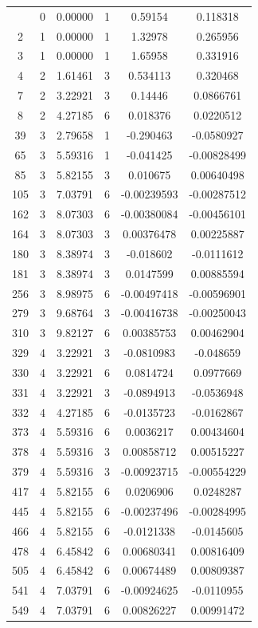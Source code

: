 \documentclass[11pt]{article}
\begin{document}
\begin{longtable} {c c c c c c}
\bottomrule
\endlastfoot
1  &	0 &	0.00000&	1&	0.59154 & 	0.118318 \\
2  &	1 &	0.00000&	1&	1.32978 &	0.265956\\
3  &	1&	0.00000&	1&	1.65958 &	0.331916\\
4  &	2&	1.61461&	3&	0.534113&	0.320468\\
7  &	2&	3.22921&	3&	0.14446	 &       0.0866761\\
8  &	2&	4.27185&	6&	0.018376&	0.0220512\\
39 &	3&	2.79658&	1&	-0.290463&	-0.0580927\\
65 &	3&	5.59316&	1&	-0.041425&	-0.00828499\\
85 &	3&	5.82155&	3&	0.010675&	0.00640498\\
105&	3&	7.03791&	6&	-0.00239593&	-0.00287512\\
162&	3&	8.07303&	6&	-0.00380084&	-0.00456101\\
164&	3&	8.07303&	3&	0.00376478&	0.00225887\\
180&	3&	8.38974&	3&	-0.018602&	-0.0111612\\
181&	3&	8.38974&	3&	0.0147599&	0.00885594\\
256&	3&	8.98975&	6&	-0.00497418&	-0.00596901\\
279&	3&	9.68764&	3&	-0.00416738&	-0.00250043\\
310&	3&	9.82127&	6&	0.00385753&	0.00462904\\
329&	4&	3.22921&	3&	-0.0810983&	-0.048659\\
330&	4&	3.22921&	6&	0.0814724&	0.0977669\\
331&	4&	3.22921&	3&	-0.0894913&	-0.0536948\\
332&	4&	4.27185&	6&	-0.0135723&	-0.0162867\\
373&	4&	5.59316&	6&	0.0036217&	0.00434604\\
378&	4&	5.59316&	3&	0.00858712&	0.00515227\\
379&	4&	5.59316&	3&	-0.00923715&	-0.00554229\\
417&	4&	5.82155&	6&	0.0206906&	0.0248287\\
445&	4&	5.82155&	6&	-0.00237496&	-0.00284995\\
466&	4&	5.82155&	6&	-0.0121338&	-0.0145605\\
478&	4&	6.45842&	6&	0.00680341&	0.00816409\\
505&	4&	6.45842&	6&	0.00674489&	0.00809387\\
541&	4&	7.03791&	6&	-0.00924625&	-0.0110955\\
549&	4&	7.03791&	6&	0.00826227&	0.00991472\\

\end{longtable}
\end{document}

